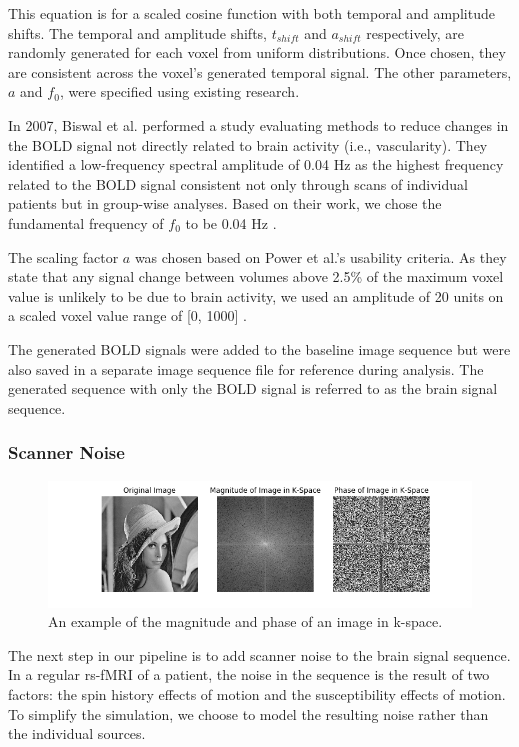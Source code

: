 \noindent This equation is for a scaled cosine function with both temporal and amplitude shifts. The temporal and amplitude shifts, $t_{shift}$ and $a_{shift}$ respectively, are randomly generated for each voxel from uniform distributions. Once chosen, they are consistent across the voxel's generated temporal signal. The other parameters, $a$ and $f_0$, were specified using existing research. 

In 2007, Biswal et al. performed a study evaluating methods to reduce changes in the BOLD signal not directly related to brain activity (i.e., vascularity). They identified a low-frequency spectral amplitude of 0.04 Hz as the highest frequency related to the BOLD signal consistent not only through scans of individual patients but in group-wise analyses. Based on their work, we chose the fundamental frequency of $f_0$ to be 0.04 Hz \cite{Biswal2007}. 

The scaling factor $a$ was chosen based on Power et al.'s usability criteria. As they state that any signal change between volumes above 2.5\% of the maximum voxel value is unlikely to be due to brain activity, we used an amplitude of 20 units on a scaled voxel value range of [0, 1000] \cite{Power2012}. 

The generated BOLD signals were added to the baseline image sequence but were also saved in a separate image sequence file for reference during analysis. The generated sequence with only the BOLD signal is referred to as the brain signal sequence.

\subsubsection{Scanner Noise}

\begin{figure}
\centering
\includegraphics[width=.9\textwidth]{5/fft_example.png}
\caption{An example of the magnitude and phase of an image in k-space.}
\label{ch5:fft_example}
\end{figure}

The next step in our pipeline is to add scanner noise to the brain signal sequence. In a regular rs-fMRI of a patient, the noise in the sequence is the result of two factors: the spin history effects of motion and the susceptibility effects of motion. To simplify the simulation, we choose to model the resulting noise rather than the individual sources.

